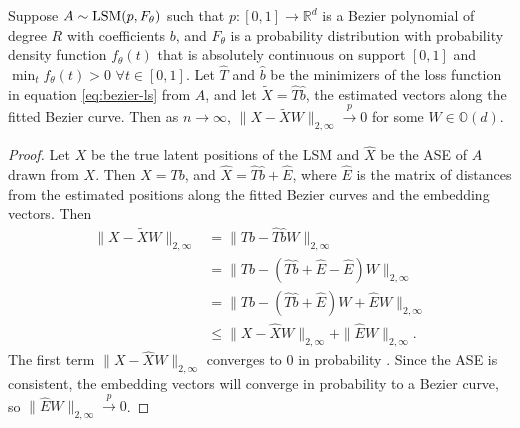 \documentclass[12pt]{article}
\begin{document}
\begin{lemma}
\label{lem:bezier-consistency}
Suppose $A \sim \mathrm{LSM}(p, F_\theta)$ such that $p : [0, 1] \to \mathbb{R}^d$ is a Bezier polynomial of degree $R$ with coefficients $b$, and $F_\theta$ is a probability distribution with probability density function $f_\theta(t)$ that is absolutely continuous on support $[0, 1]$ and $\min_t f_\theta(t) > 0$ $\forall t \in [0, 1]$. 
Let $\hat{T}$ and $\hat{b}$ be the minimizers of the loss function in equation \ref{eq:bezier-ls} from $A$, and let $\tilde{X} = \hat{T} \hat{b}$, the estimated vectors along the fitted Bezier curve. 
Then as $n \to \infty$, $\|X - \tilde{X} W\|_{2,\infty} \stackrel{p}{\to} 0$ for some $W \in \mathbb{O}(d)$.
\end{lemma}

\begin{proof}
Let $X$ be the true latent positions of the LSM and $\hat{X}$ be the ASE of $A$ drawn from $X$. 
Then $X = T b$, and $\hat{X} = \hat{T} \hat{b} + \hat{E}$, where $\hat{E}$ is the matrix of distances from the estimated positions along the fitted Bezier curves and the embedding vectors. 
Then
$$
\begin{aligned}
\|X - \tilde{X} W\|_{2, \infty} & = \|T b - \hat{T} \hat{b} W\|_{2,\infty} \\
& = \|T b - (\hat{T} \hat{b} + \hat{E} - \hat{E}) W \|_{2,\infty} \\
& = \|T b - (\hat{T} \hat{b} + \hat{E}) W + \hat{E} W\|_{2,\infty} \\
& \leq \|X - \hat{X} W\|_{2,\infty} + \|\hat{E} W\|_{2,\infty}.
\end{aligned}
$$
The first term $\|X - \hat{X} W\|_{2,\infty}$ converges to $0$ in probability \citep{lyzinski2014}. 
Since the ASE is consistent, the embedding vectors will converge in probability to a Bezier curve, so $\|\hat{E} W\|_{2,\infty} \stackrel{p}{\to} 0$. 
\end{proof}
\end{document}
